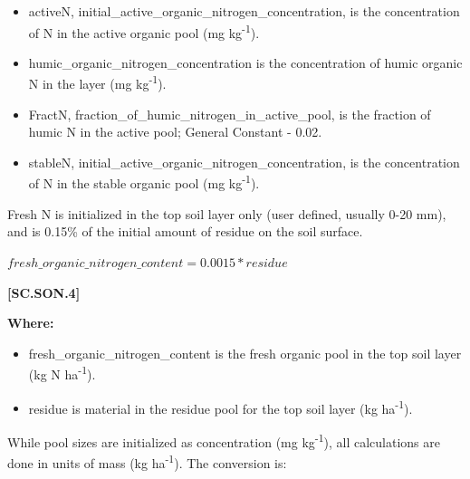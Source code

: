         \begin{itemize}
            \item activeN, initial\_active\_organic\_nitrogen\_concentration, is the concentration of N in the active organic pool (mg kg\textsuperscript{-1}).
            \item humic\_organic\_nitrogen\_concentration is the concentration of humic organic N in the layer (mg kg\textsuperscript{-1}).
            \item FractN, fraction\_of\_humic\_nitrogen\_in\_active\_pool, is the fraction of humic N in the active pool; General Constant - 0.02.
            \item stableN, initial\_active\_organic\_nitrogen\_concentration, is the concentration of N in the stable organic pool (mg kg\textsuperscript{-1}).
        \end{itemize}
    \vspace{0.5cm}

Fresh N is initialized in the top soil layer only (user defined, usually 0-20 mm), and is 0.15\% of the initial amount of residue on the soil surface.
\vspace{0.2cm}
            
    \begin{center}
 \(fresh\_organic\_nitrogen\_content=0.0015 * residue	\)
    \end{center}
        \vspace{0.5cm} 
    
            {\raggedleft \textbf{[SC.SON.4]}\par}
            \vspace{0.5cm}

        \textbf{Where:}
            
        \begin{itemize}
            \item fresh\_organic\_nitrogen\_content is the fresh organic pool in the top soil layer (kg N ha\textsuperscript{-1}).
            \item residue is material in the residue pool for the top soil layer (kg ha\textsuperscript{-1}).	
        \end{itemize}
    \vspace{0.5cm}

While pool sizes are initialized as concentration (mg kg\textsuperscript{-1}), all calculations are done in units of mass (kg ha\textsuperscript{-1}). The conversion is:
\vspace{0.2cm}
            
